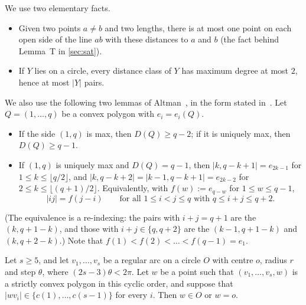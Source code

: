 We use two elementary facts.
\begin{itemize}[leftmargin=2em]
\item[(P)] Given two points $a\ne b$ and two lengths, there is at most one point on each open side of the line $ab$ with these distances to $a$ and $b$ (the fact behind Lemma~T in \cref{sec:sat}).
\item[(Cy)] If $Y$ lies on a circle, every distance class of $Y$ has maximum degree at most $2$, hence at most $|Y|$ pairs.
\end{itemize}
We also use the following two lemmas of Altman~\cite{Alt63}, in the form stated in~\cite[p.~69]{Fi95}. Let $Q=(1,\dots,q)$ be a convex polygon with $e_i=e_i(Q)$.
\begin{itemize}[leftmargin=2em]
\item[(A1)] If the side $(1,q)$ is max, then $D(Q)\ge q-2$; if it is uniquely max, then $D(Q)\ge q-1$.
\item[(A2)] If $(1,q)$ is uniquely max and $D(Q)=q-1$, then $|k,q-k+1|=e_{2k-1}$ for $1\le k\le\lfloor q/2\rfloor$, and $|k,q-k+2|=|k-1,q-k+1|=e_{2k-2}$ for $2\le k\le\lfloor(q+1)/2\rfloor$. Equivalently, with $f(w):=e_{q-w}$ for $1\le w\le q-1$,
\begin{equation}\label{eq:altman2}
|ij|=f(j-i)\qquad\text{for all }1\le i<j\le q\text{ with }q\le i+j\le q+2 .
\end{equation}
\end{itemize}
(The equivalence is a re-indexing: the pairs with $i+j=q+1$ are the $(k,q+1-k)$, and those with $i+j\in\{q,q+2\}$ are the $(k-1,q+1-k)$ and $(k,q+2-k)$.) Note that $f(1)<f(2)<\dots<f(q-1)=e_1$.

\begin{lemma}\label{lem:arcrigid}
Let $s\ge5$, and let $v_1,\dots,v_s$ be a regular arc on a circle $O$ with centre $o$, radius $r$ and step $\theta$, where $(2s-3)\theta<2\pi$. Let $w$ be a point such that $(v_1,\dots,v_s,w)$ is a strictly convex polygon in this cyclic order, and suppose that $|wv_i|\in\{c(1),\dots,c(s-1)\}$ for every $i$. Then $w\in O$ or $w=o$.
\end{lemma}

